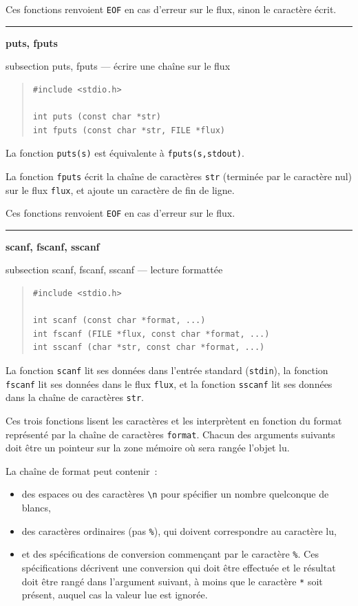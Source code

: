 \documentclass [twoside] {report}
\newcommand {\primitive} [1]
    {
	\phantomsection
	{\large \textbf {#1}}
	\addcontentsline {toc} {subsection} {#1}
    }
\newcommand {\separation}
    {
	\vspace {5mm}
	\nopagebreak
	\hrule
    }
\begin{document}
Ces fonctions renvoient \texttt {EOF} en cas d'erreur sur le flux,
sinon le caractère écrit.


\separation
\primitive {puts, fputs} --- écrire une chaîne sur le flux

\begin {quote}
\begin {verbatim}
#include <stdio.h>

int puts (const char *str)
int fputs (const char *str, FILE *flux)
\end{verbatim}
\end {quote}

La fonction \texttt {puts(s)} est équivalente à \texttt {fputs(s,stdout)}.

La fonction \texttt {fputs} écrit la chaîne de caractères \texttt {str}
(terminée par le caractère nul) sur le flux \texttt {flux},
et ajoute un caractère de fin de ligne.

Ces fonctions renvoient \texttt {EOF} en cas d'erreur sur le flux.


\separation
\primitive {scanf, fscanf, sscanf} --- lecture formattée

\begin {quote}
\begin {verbatim}
#include <stdio.h>

int scanf (const char *format, ...)
int fscanf (FILE *flux, const char *format, ...)
int sscanf (char *str, const char *format, ...)
\end{verbatim}
\end {quote}

La fonction \texttt {scanf} lit ses données dans l'entrée
standard (\texttt {stdin}), la fonction \texttt {fscanf} lit ses données
dans le flux \texttt {flux}, et la fonction \texttt {sscanf} lit ses
données dans la chaîne de caractères \texttt {str}.

Ces trois fonctions lisent les caractères et les interprètent en
fonction du format représenté par la chaîne de caractères \texttt {format}.
Chacun des arguments suivants doit être un pointeur sur la zone mémoire
où sera rangée l'objet lu.

La chaîne de format peut contenir~:

\begin {itemize}
    \item des espaces ou des caractères \verb:\n: pour spécifier un
	nombre quelconque de blancs, \par
    \item des caractères ordinaires (pas \texttt {\%}), qui doivent
	correspondre au caractère lu, \par
    \item et des spécifications de conversion commençant par le
	caractère \texttt {\%}. Ces spécifications décrivent une conversion
	qui doit être effectuée et le résultat doit être rangé dans
	l'argument suivant, à moins que le caractère \texttt {*} soit
	présent, auquel cas la valeur lue est ignorée.
\end {itemize}
\end{document}
